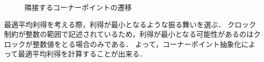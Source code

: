 \documentclass{ieicej}
\begin{document}
\begin{figure}[htbp]
	\begin{center}
		\caption{隣接するコーナーポイントの遷移}
		\label{fg:corner_point}
	\end{center}
\end{figure}



最適平均利得を考える際，利得が最小となるような振る舞いを選ぶ．
クロック制約が整数の範囲で記述されているため，利得が最小となる可能性があるのはクロックが整数値をとる場合のみである．
よって，コーナーポイント抽象化によって最適平均利得を計算することが出来る．



\ack %

%
%
\begin{thebibliography}{99}%
\bibitem{}
\end{thebibliography}

\appendix
\section{}

\begin{biography}
\end{biography}
\end{document}
